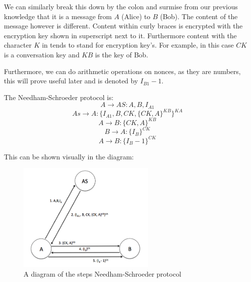 \documentclass{article}
\begin{document}
We can similarly break this down by the colon and surmise from our previous
knowledge that it is a message from $A$ (Alice) to $B$ (Bob). The content of the
message however is different. Content within curly braces is encrypted with
the encryption key shown in superscript next to it. Furthermore content with the
character $K$ in tends to stand for encryption key’s. For example, in this case
$CK$ is a conversation key and $KB$ is the key of Bob.

Furthermore, we can do arithmetic operations on nonces, as they are numbers,
this will prove useful later and is denoted by $I_{B1} - 1$.



The Needham-Schroeder protocol is:
\begin{equation}
    A \rightarrow AS: A, B, I_{A1}
\end{equation}
\begin{equation}
    As \rightarrow A: \{ I_{A1}, B, CK, \{CK, A\}^{KB} \}^{KA}
\end{equation}
\begin{equation}
    A \rightarrow B: \{CK, A\}^{KB}
\end{equation}
\begin{equation}
    B \rightarrow A: \{I_B\}^{CK}
\end{equation}
\begin{equation}
    A \rightarrow B: \{I_B - 1\}^{CK}
\end{equation}


This can be shown visually in the diagram:
\begin{figure}[ht]
    \centering
    \includegraphics[width=0.6\textwidth]{protocolDiagram.png}
    \caption{A diagram of the steps Needham-Schroeder protocol}
    \label{fig:protocolDiagram}
\end{figure}
\end{document}
